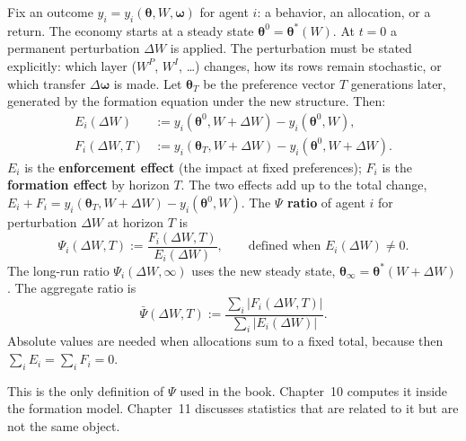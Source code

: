\documentclass[../structural_economics_book.tex]{subfiles}
\begin{document}
\begin{definition}\label{ch09:def:psi}
Fix an outcome $y_i = y_i(\boldsymbol{\theta}, W, \boldsymbol{\omega})$ for agent $i$: a behavior, an allocation, or a return. The economy starts at a steady state $\boldsymbol{\theta}^0 = \boldsymbol{\theta}^*(W)$. At $t = 0$ a permanent perturbation $\Delta W$ is applied. The perturbation must be stated explicitly: which layer ($W^P$, $W^I$, \ldots) changes, how its rows remain stochastic, or which transfer $\Delta\boldsymbol{\omega}$ is made. Let $\boldsymbol{\theta}_T$ be the preference vector $T$ generations later, generated by the formation equation under the new structure. Then:
\begin{align}
E_i(\Delta W) &:= y_i(\boldsymbol{\theta}^0, W + \Delta W) - y_i(\boldsymbol{\theta}^0, W), \label{ch09:eq:E}\\
F_i(\Delta W, T) &:= y_i(\boldsymbol{\theta}_T, W + \Delta W) - y_i(\boldsymbol{\theta}^0, W + \Delta W). \label{ch09:eq:F}
\end{align}
$E_i$ is the \textbf{enforcement effect} (the impact at fixed preferences); $F_i$ is the \textbf{formation effect} by horizon $T$.
The two effects add up to the total change, $E_i + F_i = y_i(\boldsymbol{\theta}_T, W+\Delta W) - y_i(\boldsymbol{\theta}^0, W)$. The \textbf{$\Psi$ ratio} of agent $i$ for perturbation $\Delta W$ at horizon $T$ is
\begin{equation}\label{ch09:eq:psi}
\Psi_i(\Delta W, T) := \frac{F_i(\Delta W, T)}{E_i(\Delta W)}, \qquad \text{defined when } E_i(\Delta W) \neq 0.
\end{equation}
The long-run ratio $\Psi_i(\Delta W, \infty)$ uses the new steady state, $\boldsymbol{\theta}_\infty = \boldsymbol{\theta}^*(W + \Delta W)$. The aggregate ratio is
\[
\bar{\Psi}(\Delta W, T) := \frac{\sum_i |F_i(\Delta W, T)|}{\sum_i |E_i(\Delta W)|}.
\] Absolute values are needed when allocations sum to a fixed total, because then $\sum_i E_i = \sum_i F_i = 0$.
\end{definition}

This is the only definition of $\Psi$ used in the book. Chapter~10 computes it inside the formation model. Chapter~11 discusses statistics that are related to it but are not the same object.
\end{document}
